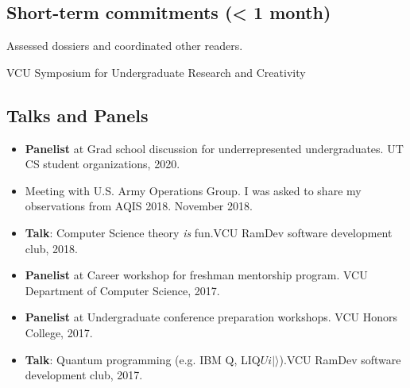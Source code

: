 \documentclass[11pt,letterpaper,serif]{moderncv}
\begin{document}

\smallskip
\subsection{Short-term commitments (< 1 month)}



{
	\begin{adjustwidth}{.25in}{}
		Assessed dossiers and coordinated other readers.
	\end{adjustwidth}
}

{
	\begin{adjustwidth}{.25in}{}
		VCU Symposium for Undergraduate Research and Creativity
	\end{adjustwidth}
}


\smallskip
\subsection{Talks and Panels}

\begin{itemize}
	\item[\textbullet] \textbf{Panelist} at Grad school discussion for underrepresented undergraduates. UT CS student organizations, 2020.
	\item[\textbullet] Meeting with U.S. Army Operations Group. I was asked to share my observations from AQIS 2018. November 2018.
	\item[\textbullet] \textbf{Talk}: Computer Science theory \emph{is} fun.\quad VCU RamDev software development club, 2018.
	\item[\textbullet] \textbf{Panelist} at Career workshop for freshman mentorship program. VCU Department of Computer Science, 2017.
	\item[\textbullet] \textbf{Panelist} at Undergraduate conference preparation workshops. VCU Honors College, 2017.
	\item[\textbullet] \textbf{Talk}: Quantum programming (e.g. IBM Q, LIQ$Ui|\rangle$).\quad VCU RamDev software development club, 2017.
\end{itemize}
\end{document}
